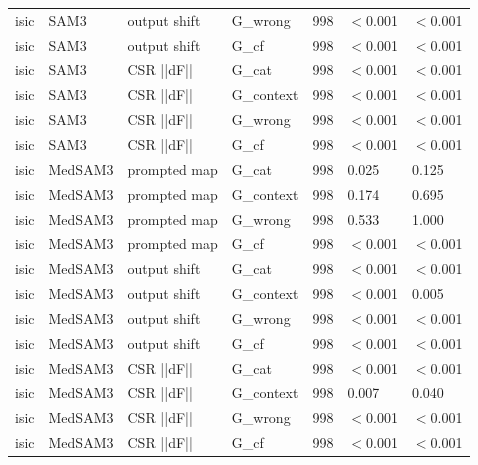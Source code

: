 \begin{tabular}{llllrll}
isic & SAM3 & output shift & G_wrong & 998 & $<$0.001 & $<$0.001 \\
isic & SAM3 & output shift & G_cf & 998 & $<$0.001 & $<$0.001 \\
isic & SAM3 & CSR  ||dF|| & G_cat & 998 & $<$0.001 & $<$0.001 \\
isic & SAM3 & CSR  ||dF|| & G_context & 998 & $<$0.001 & $<$0.001 \\
isic & SAM3 & CSR  ||dF|| & G_wrong & 998 & $<$0.001 & $<$0.001 \\
isic & SAM3 & CSR  ||dF|| & G_cf & 998 & $<$0.001 & $<$0.001 \\
isic & MedSAM3 & prompted map & G_cat & 998 & 0.025 & 0.125 \\
isic & MedSAM3 & prompted map & G_context & 998 & 0.174 & 0.695 \\
isic & MedSAM3 & prompted map & G_wrong & 998 & 0.533 & 1.000 \\
isic & MedSAM3 & prompted map & G_cf & 998 & $<$0.001 & $<$0.001 \\
isic & MedSAM3 & output shift & G_cat & 998 & $<$0.001 & $<$0.001 \\
isic & MedSAM3 & output shift & G_context & 998 & $<$0.001 & 0.005 \\
isic & MedSAM3 & output shift & G_wrong & 998 & $<$0.001 & $<$0.001 \\
isic & MedSAM3 & output shift & G_cf & 998 & $<$0.001 & $<$0.001 \\
isic & MedSAM3 & CSR  ||dF|| & G_cat & 998 & $<$0.001 & $<$0.001 \\
isic & MedSAM3 & CSR  ||dF|| & G_context & 998 & 0.007 & 0.040 \\
isic & MedSAM3 & CSR  ||dF|| & G_wrong & 998 & $<$0.001 & $<$0.001 \\
isic & MedSAM3 & CSR  ||dF|| & G_cf & 998 & $<$0.001 & $<$0.001 \\
\bottomrule
\end{tabular}
